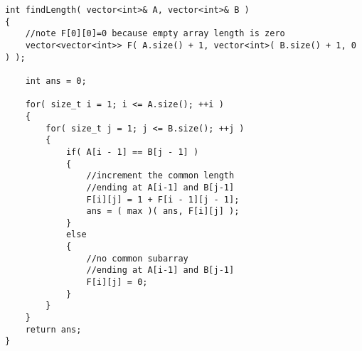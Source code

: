 \setcounter{lstlisting}{0}
\begin{lstlisting}[style=customc, caption={DP}]
int findLength( vector<int>& A, vector<int>& B )
{
    //note F[0][0]=0 because empty array length is zero
    vector<vector<int>> F( A.size() + 1, vector<int>( B.size() + 1, 0 ) );

    int ans = 0;

    for( size_t i = 1; i <= A.size(); ++i )
    {
        for( size_t j = 1; j <= B.size(); ++j )
        {
            if( A[i - 1] == B[j - 1] )
            {
                //increment the common length
                //ending at A[i-1] and B[j-1]
                F[i][j] = 1 + F[i - 1][j - 1];
                ans = ( max )( ans, F[i][j] );
            }
            else
            {
                //no common subarray
                //ending at A[i-1] and B[j-1]
                F[i][j] = 0;
            }
        }
    }
    return ans;
}
\end{lstlisting}